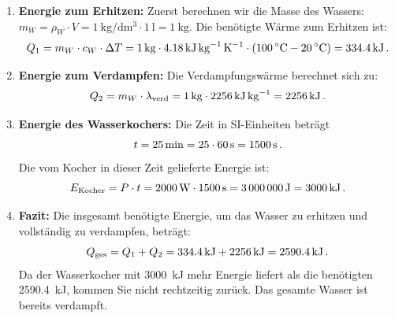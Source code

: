 \documentclass[ngerman]{scrreprt}
\newenvironment{loesungbox}[1]
  {\needspace{5\baselineskip}\begin{loesungboxstyle}[frametitle={#1}]}
  {\end{loesungboxstyle}}
\begin{document}
\begin{loesungbox}{Lösung zu \Cref{aufg:wasserkocher}}
\begin{enumerate}
\begin{center}
{\begin{tikzpicture}[
                axis/.style={-{Stealth}, line width=1.2pt},
                box/.style={draw, fill=blue!15, minimum height=0.8cm, align=center}
            ]
        \end{tikzpicture}
    }
    \end{center}
    \item \textbf{Energie zum Erhitzen:}
    Zuerst berechnen wir die Masse des Wassers: $m_W = \rho_W \cdot V = \SI{1}{\kilogram\per\deci\metre\cubed} \cdot \SI{1}{\litre} = \SI{1}{\kilogram}$. Die benötigte Wärme zum Erhitzen ist:
    \begin{equation}\label{eq: wasserkocher_erhitzen}
        Q_{1} = m_{W} \cdot c_{W} \cdot \Delta T = \SI{1}{\kg} \cdot \SI{4.18}{\kilo\joule\per\kilogram\per\kelvin} \cdot (\SI{100}{\celsius} - \SI{20}{\celsius}) = \SI{334.4}{\kilo\joule} \mDot
    \end{equation}
    \item \textbf{Energie zum Verdampfen:}
    Die Verdampfungswärme berechnet sich zu:
    \begin{equation}\label{eq: wasserkocher_verdampfen}
        Q_{2} = m_{W} \cdot \lambda_{\text{verd}} = \SI{1}{\kg} \cdot \SI{2256}{\kilo\joule\per\kilogram} = \SI{2256}{\kilo\joule} \mDot
    \end{equation}
    \item \textbf{Energie des Wasserkochers:}
    Die Zeit in SI-Einheiten beträgt 
    $$t = \SI{25}{\minute} = 25 \cdot 60\,\si{\second} = \SI{1500}{\second} \,.$$
    Die vom Kocher in dieser Zeit gelieferte Energie ist:
    \begin{equation}\label{eq: wasserkocher_energie}
        E_{\text{Kocher}} = P \cdot t = \SI{2000}{\watt} \cdot \SI{1500}{\second} = \SI{3000000}{\joule} = \SI{3000}{\kilo\joule} \,.
    \end{equation}
    \item \textbf{Fazit:}
    Die insgesamt benötigte Energie, um das Wasser zu erhitzen und vollständig zu verdampfen, beträgt:
    \begin{equation}\label{eq: wasserkocher_gesamtenergie}
        Q_{\text{ges}} = Q_1 + Q_2 = \SI{334.4}{\kilo\joule} + \SI{2256}{\kilo\joule} = \SI{2590.4}{\kilo\joule} \,.
    \end{equation}
    Da der Wasserkocher mit \SI{3000}{\kilo\joule} mehr Energie liefert als die benötigten \SI{2590.4}{\kilo\joule}, kommen Sie nicht rechtzeitig zurück. Das gesamte Wasser ist bereits verdampft.
\end{enumerate}
\end{loesungbox}
\end{document}
